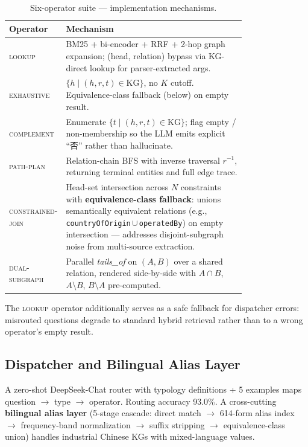\documentclass[10pt,a4paper,twocolumn]{article}
\newcommand{\op}[1]{\textsc{\small #1}}
\begin{document}
\begin{table}[t]
\centering
\small
\caption{Six-operator suite --- implementation mechanisms.}
\label{tab:operators}
\begin{tabular}{l p{0.78\linewidth}}
\toprule
\textbf{Operator} & \textbf{Mechanism} \\
\midrule
\op{lookup}            & BM25 + bi-encoder + RRF + 2-hop graph expansion; (head, relation) bypass via KG-direct lookup for parser-extracted args. \\
\op{exhaustive}        & $\{h \mid (h, r, t) \in \text{KG}\}$, no $K$ cutoff. Equivalence-class fallback (below) on empty result. \\
\op{complement}        & Enumerate $\{t \mid (h, r, t) \in \text{KG}\}$; flag empty / non-membership so the LLM emits explicit ``否'' rather than hallucinate. \\
\op{path-plan}         & Relation-chain BFS with inverse traversal $r^{-1}$, returning terminal entities and full edge trace. \\
\op{constrained-join}  & Head-set intersection across $N$ constraints with \textbf{equivalence-class fallback}: unions semantically equivalent relations (e.g., \texttt{countryOfOrigin}\,$\cup$\,\texttt{operatedBy}) on empty intersection --- addresses disjoint-subgraph noise from multi-source extraction. \\
\op{dual-subgraph}     & Parallel \textit{tails\_of} on $(A,B)$ over a shared relation, rendered side-by-side with $A\!\cap\!B$, $A{\setminus}B$, $B{\setminus}A$ pre-computed. \\
\bottomrule
\end{tabular}
\end{table}

The \op{lookup} operator additionally serves as a safe fallback for dispatcher errors: misrouted questions degrade to standard hybrid retrieval rather than to a wrong operator's empty result.

\subsection{Dispatcher and Bilingual Alias Layer}
A zero-shot DeepSeek-Chat router with typology definitions + 5 examples maps question $\to$ type $\to$ operator. Routing accuracy 93.0\%. A cross-cutting \textbf{bilingual alias layer} (5-stage cascade: direct match $\to$ 614-form alias index $\to$ frequency-band normalization $\to$ suffix stripping $\to$ equivalence-class union) handles industrial Chinese KGs with mixed-language values.
\end{document}
